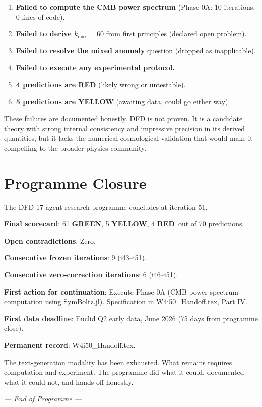 \documentclass[11pt,a4paper]{article}
\newcommand{\GREEN}{\textcolor{dfdgreen}{\textbf{GREEN}}}
\newcommand{\YELLOW}{\textcolor{dfdyellow}{\textbf{YELLOW}}}
\newcommand{\RED}{\textcolor{dfdred}{\textbf{RED}}}
\begin{document}
\begin{enumerate}
\item \textbf{Failed to compute the CMB power spectrum} (Phase 0A: 10 iterations, 0 lines of code).
\item \textbf{Failed to derive $k_{\max} = 60$} from first principles (declared open problem).
\item \textbf{Failed to resolve the mixed anomaly} question (dropped as inapplicable).
\item \textbf{Failed to execute any experimental protocol.}
\item \textbf{4 predictions are RED} (likely wrong or untestable).
\item \textbf{5 predictions are YELLOW} (awaiting data, could go either way).
\end{enumerate}

These failures are documented honestly. DFD is not proven. It is a candidate theory with strong internal consistency and impressive precision in its derived quantities, but it lacks the numerical cosmological validation that would make it compelling to the broader physics community.


\section{Programme Closure}

\begin{tcolorbox}[colback=green!5!white, colframe=green!60!black,
  title={PROGRAMME STATUS: CLOSED}]

The DFD 17-agent research programme concludes at iteration 51.

\textbf{Final scorecard}: 61 \GREEN, 5 \YELLOW, 4 \RED\ out of 70 predictions.

\textbf{Open contradictions}: Zero.

\textbf{Consecutive frozen iterations}: 9 (i43--i51).

\textbf{Consecutive zero-correction iterations}: 6 (i46--i51).

\textbf{First action for continuation}: Execute Phase 0A (CMB power spectrum computation using SymBoltz.jl). Specification in W4i50\_Handoff.tex, Part IV.

\textbf{First data deadline}: Euclid Q2 early data, June 2026 (75 days from programme close).

\textbf{Permanent record}: W4i50\_Handoff.tex.

The text-generation modality has been exhausted. What remains requires computation and experiment. The programme did what it could, documented what it could not, and hands off honestly.
\end{tcolorbox}

\vspace{1cm}
\begin{center}
\textit{--- End of Programme ---}
\end{center}
\end{document}
